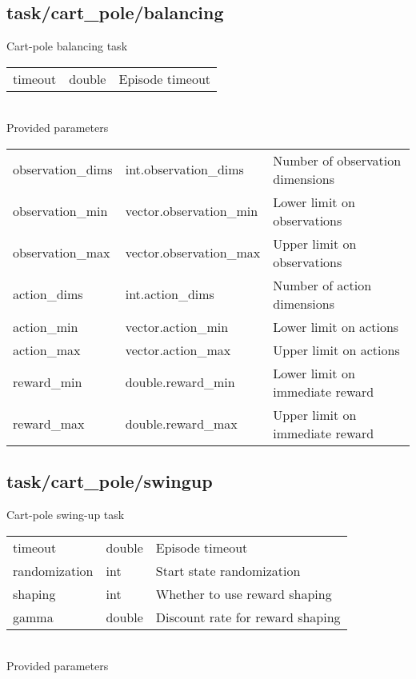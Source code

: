 \subsection{task/cart\_pole/balancing}
\noindent Cart-pole balancing task\\

\noindent\begin{tabular}{@{}lll@{}}
timeout&double&Episode timeout\\
\end{tabular}
\\

\noindent Provided parameters\\

\noindent\begin{tabular}{@{}lll@{}}
observation\_dims&int.observation\_dims&Number of observation dimensions\\
observation\_min&vector.observation\_min&Lower limit on observations\\
observation\_max&vector.observation\_max&Upper limit on observations\\
action\_dims&int.action\_dims&Number of action dimensions\\
action\_min&vector.action\_min&Lower limit on actions\\
action\_max&vector.action\_max&Upper limit on actions\\
reward\_min&double.reward\_min&Lower limit on immediate reward\\
reward\_max&double.reward\_max&Upper limit on immediate reward\\
\end{tabular}
\subsection{task/cart\_pole/swingup}
\noindent Cart-pole swing-up task\\

\noindent\begin{tabular}{@{}lll@{}}
timeout&double&Episode timeout\\
randomization&int&Start state randomization\\
shaping&int&Whether to use reward shaping\\
gamma&double&Discount rate for reward shaping\\
\end{tabular}
\\

\noindent Provided parameters\\

